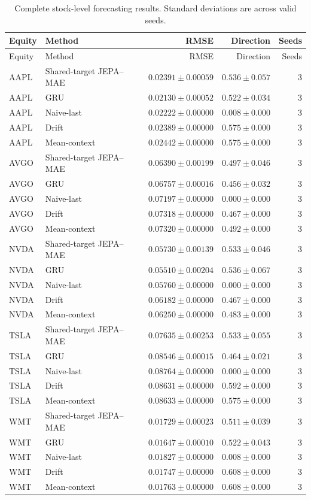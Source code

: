 \begin{longtable}{llrrr}
\caption{Complete stock-level forecasting results. Standard deviations are across valid seeds.}\label{tab:appendix_stock_metrics}\\
\toprule
Equity & Method & RMSE & Direction & Seeds \\
\midrule
\endfirsthead
\toprule
Equity & Method & RMSE & Direction & Seeds \\
\midrule
\endhead
AAPL & Shared-target JEPA--MAE & $0.02391 \pm 0.00059$ & $0.536 \pm 0.057$ & 3 \\
AAPL & GRU & $0.02130 \pm 0.00052$ & $0.522 \pm 0.034$ & 3 \\
AAPL & Naive-last & $0.02222 \pm 0.00000$ & $0.008 \pm 0.000$ & 3 \\
AAPL & Drift & $0.02389 \pm 0.00000$ & $0.575 \pm 0.000$ & 3 \\
AAPL & Mean-context & $0.02442 \pm 0.00000$ & $0.575 \pm 0.000$ & 3 \\
AVGO & Shared-target JEPA--MAE & $0.06390 \pm 0.00199$ & $0.497 \pm 0.046$ & 3 \\
AVGO & GRU & $0.06757 \pm 0.00016$ & $0.456 \pm 0.032$ & 3 \\
AVGO & Naive-last & $0.07197 \pm 0.00000$ & $0.000 \pm 0.000$ & 3 \\
AVGO & Drift & $0.07318 \pm 0.00000$ & $0.467 \pm 0.000$ & 3 \\
AVGO & Mean-context & $0.07320 \pm 0.00000$ & $0.492 \pm 0.000$ & 3 \\
NVDA & Shared-target JEPA--MAE & $0.05730 \pm 0.00139$ & $0.533 \pm 0.046$ & 3 \\
NVDA & GRU & $0.05510 \pm 0.00204$ & $0.536 \pm 0.067$ & 3 \\
NVDA & Naive-last & $0.05760 \pm 0.00000$ & $0.000 \pm 0.000$ & 3 \\
NVDA & Drift & $0.06182 \pm 0.00000$ & $0.467 \pm 0.000$ & 3 \\
NVDA & Mean-context & $0.06250 \pm 0.00000$ & $0.483 \pm 0.000$ & 3 \\
TSLA & Shared-target JEPA--MAE & $0.07635 \pm 0.00253$ & $0.533 \pm 0.055$ & 3 \\
TSLA & GRU & $0.08546 \pm 0.00015$ & $0.464 \pm 0.021$ & 3 \\
TSLA & Naive-last & $0.08764 \pm 0.00000$ & $0.000 \pm 0.000$ & 3 \\
TSLA & Drift & $0.08631 \pm 0.00000$ & $0.592 \pm 0.000$ & 3 \\
TSLA & Mean-context & $0.08633 \pm 0.00000$ & $0.575 \pm 0.000$ & 3 \\
WMT & Shared-target JEPA--MAE & $0.01729 \pm 0.00023$ & $0.511 \pm 0.039$ & 3 \\
WMT & GRU & $0.01647 \pm 0.00010$ & $0.522 \pm 0.043$ & 3 \\
WMT & Naive-last & $0.01827 \pm 0.00000$ & $0.008 \pm 0.000$ & 3 \\
WMT & Drift & $0.01747 \pm 0.00000$ & $0.608 \pm 0.000$ & 3 \\
WMT & Mean-context & $0.01763 \pm 0.00000$ & $0.608 \pm 0.000$ & 3 \\
\bottomrule
\end{longtable}
